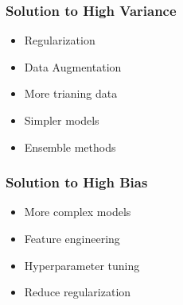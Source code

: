 \documentclass{article}
\begin{document}
\subsubsection{Solution to High Variance}
\begin{definition}
    \begin{itemize}
        \item Regularization
        \item Data Augmentation
        \item More trianing data 
        \item Simpler models
        \item Ensemble methods
    \end{itemize}
\end{definition}

\subsubsection{Solution to High Bias}
\begin{definition}
    \begin{itemize}
        \item More complex models
        \item Feature engineering
        \item Hyperparameter tuning
        \item Reduce regularization
    \end{itemize}
\end{definition}
\newpage
\end{document}
